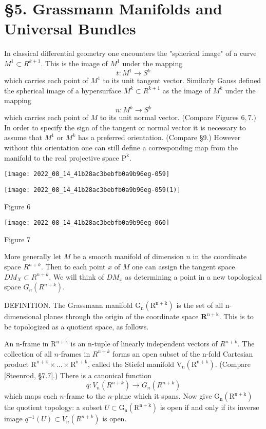\documentclass[10pt]{article}
\begin{document}
\section{§5. Grassmann Manifolds and Universal Bundles}
In classical differential geometry one encounters the "spherical image" of a curve $M^{1} \subset R^{k+1}$. This is the image of $M^{1}$ under the mapping
$$
t: M^{1} \rightarrow S^{k}
$$
which carries each point of $M^{1}$ to its unit tangent vector. Similarly Gauss defined the spherical image of a hypersurface $M^{k} \subset R^{k+1}$ as the image of $M^{k}$ under the mapping
$$
n: M^{k} \rightarrow S^{k}
$$
which carries each point of $M$ to its unit normal vector. (Compare Figures $6,7 .)$ In order to specify the sign of the tangent or normal vector it is necessary to assume that $M^{1}$ or $M^{k}$ has a preferred orientation. (Compare §9.) However without this orientation one can still define a corresponding map from the manifold to the real projective space $\mathrm{P}^{\mathrm{k}}$.

\texttt{[image: 2022\_08\_14\_41b28ac3bebfb0a9b96eg-059]}

\texttt{[image: 2022\_08\_14\_41b28ac3bebfb0a9b96eg-059(1)]}

Figure 6

\texttt{[image: 2022\_08\_14\_41b28ac3bebfb0a9b96eg-060]}

Figure 7

More generally let $M$ be a smooth manifold of dimension $n$ in the coordinate space $R^{n+k}$. Then to each point $x$ of $M$ one can assign the tangent space $D M_{X} \subset R^{n+k}$. We will think of $D M_{x}$ as determining a point in a new topological space $G_{n}\left(R^{n+k}\right)$.

DEFINITION. The Grassmann manifold $\mathrm{G}_{\mathrm{n}}\left(\mathrm{R}^{\mathrm{n}+\mathrm{k}}\right)$ is the set of all $\mathrm{n}$-dimensional planes through the origin of the coordinate space $\mathbf{R}^{\mathrm{n}+\mathrm{k}}$. This is to be topologized as a quotient space, as follows.

An $\mathrm{n}$-frame in $\mathrm{R}^{\mathrm{n}+\mathrm{k}}$ is an $\mathrm{n}$-tuple of linearly independent vectors of $R^{n+k}$. The collection of all $n$-frames in $R^{n+k}$ forms an open subset of the $\mathrm{n}$-fold Cartesian product $\mathrm{R}^{\mathrm{n}+\mathrm{k}} \times \ldots \times \mathrm{R}^{\mathrm{n}+\mathrm{k}}$, called the Stiefel manifold $\mathrm{V}_{\mathrm{n}}\left(\mathrm{R}^{\mathrm{n}+\mathrm{k}}\right)$. (Compare [Steenrod, §7.7].) There is a canonical function
$$
q: V_{n}\left(R^{n+k}\right) \rightarrow G_{n}\left(R^{n+k}\right)
$$
which maps each $n$-frame to the $n$-plane which it spans. Now give $\mathrm{G}_{\mathrm{n}}\left(\mathrm{R}^{\mathrm{n}+\mathrm{k}}\right)$ the quotient topology: a subset $U \subset \mathrm{G}_{\mathrm{n}}\left(\mathrm{R}^{\mathrm{n}+\mathrm{k}}\right)$ is open if and only if its inverse image $q^{-1}(U) \subset V_{n}\left(R^{n+k}\right)$ is open.
\end{document}
